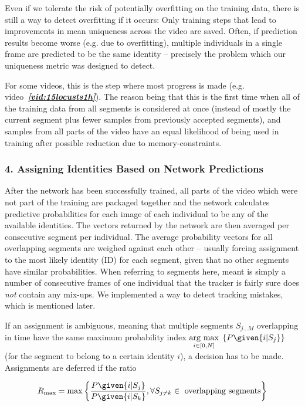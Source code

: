 \documentclass[9pt,lineno]{elife}
\newcommand{\videoref}[1]{video~\textit{\textbf{\ref{#1}}}}
\newcommand{\argmax}[1]{\underset{#1}{\operatorname{arg}\,\operatorname{max}}\;}
\newcommand{\changemade}[1]{#1}
\begin{document}
\changemade{Even if we tolerate the risk of potentially overfitting on the training data, there is still a way to detect} overfitting if it occurs: \changemade{Only training steps that lead to improvements in mean uniqueness across the video} are saved. \changemade{Often, if prediction results become worse (e.g. due to overfitting), multiple individuals in a single frame are predicted to be the same identity -- precisely the problem which our uniqueness metric was designed to detect.}

\changemade{F}or some videos, this is the step where most progress is made (e.g. \videoref{vid:15locusts1h}). The reason being that this is the first time when all of the training data from all segments is considered at once (instead of mostly the current segment plus fewer samples from previously accepted segments), and samples from all parts of the video \changemade{have} an equal likelihood of being used in training after possible reduction due to memory-constraints.

\subsubsection{4. Assigning Identities Based on Network Predictions}

After the network has been successfully trained, all parts of the video which were not part of the training are packaged together and the network calculates predictive probabilities for each image of each individual to be any of the available identities. The vectors returned by the network are then averaged per consecutive segment per individual. The average probability vectors for all overlapping segments are weighed against each other -- usually forcing assignment to the most likely identity (ID) for each segment, given that no other segments have similar probabilities. When referring to segments here, meant is simply a number of consecutive frames of one individual that the tracker is fairly sure does \textit{not} contain any mix-ups. We implemented a way to detect tracking mistakes, which is mentioned later.

If an assignment is ambiguous, meaning that multiple segments $S_{j\dots M}$ overlapping in time have the same maximum probability index $\argmax{i\in[0,N]} \left\{ P\given{i|S_j} \right\}$ (for the segment to belong to a certain identity $i$), a decision has to be made. Assignments are deferred if the ratio

$$ R_\mathrm{max} = \max\left\{ 
\frac{P\given{i | S_j}}{P\given{i | S_k}}, \forall S_{j\not= k}\in \mathrm{\ overlapping\ segments} \right\} $$
\end{document}

